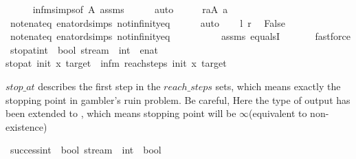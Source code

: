 \begin{isabellebody}
\ \ \ \ \isamarkupfalse%
\ infm{\isachardot}{\kern0pt}simps{\isacharbrackleft}{\kern0pt}of\ A{\isacharbrackright}{\kern0pt}\ assms\isanewline
\ \ \ \ \isamarkupfalse%
\ auto\isanewline
\ \ \isamarkupfalse%
\ \isamarkupfalse%
\ r{\isacharcolon}{\kern0pt}{\isachardoublequoteopen}{\isasymforall}a{\isasymin}A{\isachardot}{\kern0pt}\ a\ {\isacharless}{\kern0pt}\ {\isasyminfinity}{\isachardoublequoteclose}\isanewline
\ \ \ \ \isamarkupfalse%
\ not{\isacharunderscore}{\kern0pt}enat{\isacharunderscore}{\kern0pt}eq\ enat{\isacharunderscore}{\kern0pt}ord{\isacharunderscore}{\kern0pt}simps\ not{\isacharunderscore}{\kern0pt}infinity{\isacharunderscore}{\kern0pt}eq\isanewline
\ \ \ \ \isamarkupfalse%
\ auto\isanewline
\ \ \isamarkupfalse%
\ l\ r\ \isamarkupfalse%
\ False\isanewline
\ \ \ \ \isamarkupfalse%
\ not{\isacharunderscore}{\kern0pt}enat{\isacharunderscore}{\kern0pt}eq\ enat{\isacharunderscore}{\kern0pt}ord{\isacharunderscore}{\kern0pt}simps\ not{\isacharunderscore}{\kern0pt}infinity{\isacharunderscore}{\kern0pt}eq\isanewline
\ \ \ \ \ \ \ \ \ \ assms\ equals{}I\ \isanewline
\ \ \ \ \isamarkupfalse%
\ fastforce\isanewline
{}\isamarkupfalse%
%
\endisatagproof
{\isafoldproof}%
%
\isadelimproof
\isanewline
%
\endisadelimproof
\isanewline
\isanewline
{}\isamarkupfalse%
\ stop{\isacharunderscore}{\kern0pt}at{\isacharcolon}{\kern0pt}{\isacharcolon}{\kern0pt}{\isachardoublequoteopen}int\ {\isasymRightarrow}\ bool\ stream\ {\isasymRightarrow}\ int\ {\isasymRightarrow}\ enat{\isachardoublequoteclose}\ \isanewline
{\isachardoublequoteopen}stop{\isacharunderscore}{\kern0pt}at\ init\ x\ target\ {\isacharequal}{\kern0pt}\ {\isacharparenleft}{\kern0pt}infm\ {\isacharparenleft}{\kern0pt}reach{\isacharunderscore}{\kern0pt}steps\ init\ x\ target{\isacharparenright}{\kern0pt}{\isacharparenright}{\kern0pt}{\isachardoublequoteclose}%
\begin{isamarkuptext}%
$stop\_at$ describes the first step in the $reach\_steps$ sets, which means exactly the stopping point in
gambler's ruin problem. Be careful, Here the type of output has been extended to , which means
stopping point will be $\infty$(equivalent to non-existence)%
\end{isamarkuptext}\isamarkuptrue%
\isamarkupfalse%
\ success{\isacharcolon}{\kern0pt}{\isacharcolon}{\kern0pt}{\isachardoublequoteopen}int\ {\isasymRightarrow}\ bool\ stream\ {\isasymRightarrow}\ int\ {\isasymRightarrow}\ bool{\isachardoublequoteclose}\isanewline

\end{isabellebody}
